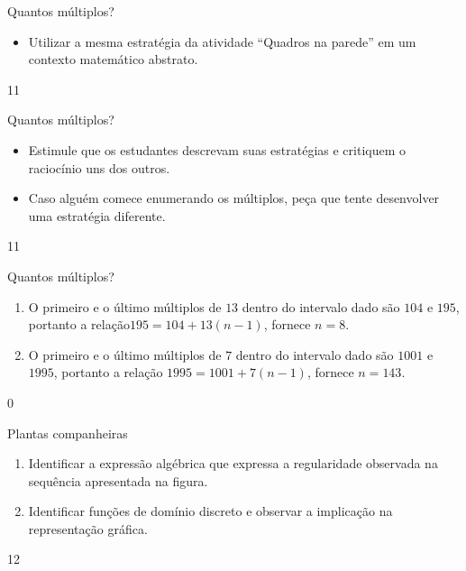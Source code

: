 \begin{objectives}{Quantos múltiplos?}
{
\begin{itemize}
\item Utilizar a mesma estratégia da atividade “Quadros na parede” em um contexto matemático abstrato.
\end{itemize}
}{1}{1}
\end{objectives}
\begin{sugestions}{Quantos múltiplos?}
{
\begin{itemize}
\item Estimule que os estudantes descrevam suas estratégias e critiquem o raciocínio uns dos outros.
\item Caso alguém comece enumerando os múltiplos, peça que tente desenvolver uma estratégia diferente.

\end{itemize}
}{1}{1}
\end{sugestions}
\begin{answer}{Quantos múltiplos?}
{
\begin{enumerate}
\item O primeiro e o último múltiplos de $13$ dentro do intervalo dado são $104$ e $195$, portanto a relação$ 195=104+13(n-1)$, fornece $n=8$.
\item O primeiro e o último múltiplos de $7$ dentro do intervalo dado são $1001$ e $1995$, portanto a relação $1995=1001+7(n-1)$, fornece $n=143$.
\end{enumerate}
}{0}
\end{answer}
\begin{objectives}{Plantas companheiras}
{
\begin{enumerate}
\item Identificar a expressão algébrica que expressa a regularidade observada na sequência apresentada na figura.
\item Identificar funções de domínio discreto e observar a implicação na representação gráfica.
\end{enumerate}
}{1}{2}
\end{objectives}
\marginpar{\vspace{-2em}}

